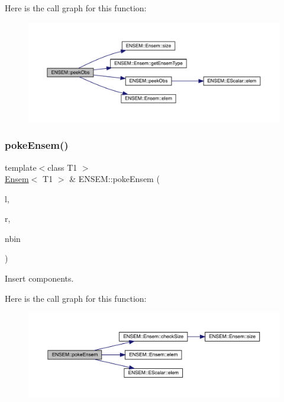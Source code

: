 Here is the call graph for this function\+:\nopagebreak
\begin{figure}[H]
\begin{center}
\leavevmode
\includegraphics[width=350pt]{d1/d9e/group__eensem_gadb8dd6729310042f809bf94db594bc5b_cgraph}
\end{center}
\end{figure}
\mbox{\label{group__eensem_gac250f0269fc0f62be437e1f400b3b7b9}} 
\subsubsection{\texorpdfstring{pokeEnsem()}{pokeEnsem()}}
{\footnotesize\ttfamily template$<$class T1 $>$ \\
\mbox{\hyperlink{classENSEM_1_1Ensem}{Ensem}}$<$ T1 $>$ \& E\+N\+S\+E\+M\+::poke\+Ensem (\begin{DoxyParamCaption}\item[{\mbox{\hyperlink{classENSEM_1_1Ensem}{Ensem}}$<$ T1 $>$ \&}]{l,  }\item[{const \mbox{\hyperlink{classENSEM_1_1EScalar}{E\+Scalar}}$<$ T1 $>$ \&}]{r,  }\item[{int}]{nbin }\end{DoxyParamCaption})\hspace{0.3cm}{\ttfamily [inline]}}



Insert components. 

Here is the call graph for this function\+:\nopagebreak
\begin{figure}[H]
\begin{center}
\leavevmode
\includegraphics[width=350pt]{d1/d9e/group__eensem_gac250f0269fc0f62be437e1f400b3b7b9_cgraph}
\end{center}
\end{figure}
\mbox{\label{group__eensem_ga44fada3144f6b1bb4d161722a389abd9}} 
